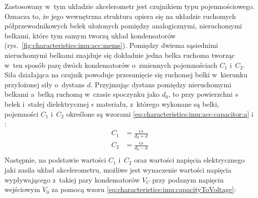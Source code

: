 																																											
Zastosowany w~tym układzie akcelerometr jest czujnikiem typu pojemnościowego. Oznacza to, że jego wewnętrzna struktura opiera się na układzie ruchomych półprzewodnikowych belek ułożonych pomiędzy analogicznymi, nieruchomymi belkami, które tym samym tworzą układ kondensatorów (rys.~\ref{fig:characteristics:imu:acc:mems}). Pomiędzy dwiema sąsiednimi nieruchomymi belkami znajduje się dokładnie jedna belka ruchoma tworząc w~ten sposób parę dwóch kondensatorów o~zmiennych pojemnościach $C_1$ i~$C_2$. Siła działająca na czujnik powoduje przesunięcie się ruchomej belki w~kierunku przyłożonej siły o~dystans $d$. Przyjmując dystans pomiędzy nieruchomymi belkami a~belką ruchomą w~czasie spoczynku jako $d_0$, to przy powierzchni $s$ belek i~stałej dielektrycznej $\epsilon$ materiału, z~którego wykonane są belki, pojemności $C_1$ i~$C_2$ określone są wzorami \ref{eq:characteristics:imu:acc:capacitor:a} i \label{eq:characteristics:imu:acc:capacitor:b}:																																												
\begin{subequations}
	\begin{align}
		C_1 & = \frac{\epsilon s}{d_0 + d}\label{eq:characteristics:imu:acc:capacitor:a} \\ 
		C_2 & = \frac{\epsilon s}{d_0 - d}\label{eq:characteristics:imu:acc:capacitor:b} \\		
	\end{align}
\end{subequations}																																												
Następnie, na podstawie wartości $C_1$ i~$C_2$ oraz wartości napięcia elektrycznego jaki zasila układ akcelerometru, możliwe jest wynaczenie wartości napięcia wypływającego z~takiej pary kondensatorów $V_C$ przy podanym napięciu wejściowym $V_0$ za pomocą wzoru \ref{eq:characteristics:imu:capacityToVoltage}:
				
